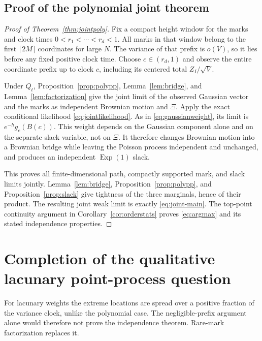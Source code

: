\documentclass[11pt,a4paper]{article}
\numberwithin{equation}{section}
\theoremstyle{definition}
\theoremstyle{remark}
\newcommand{\Exp}{\operatorname{Exp}}
\begin{document}
\subsection{Proof of the polynomial joint theorem}
\begin{proof}[Proof of Theorem~\ref{thm:jointpoly}]
Fix a compact height window for the marks and clock times
$0<r_1<\cdots<r_d<1$. All marks in that window belong to the first
$\lceil2M\rceil$ coordinates for large $N$. The variance of that
prefix is $o(V)$, so it lies before any fixed positive clock time.
Choose $c\in(r_d,1)$ and observe the entire coordinate prefix up to
clock $c$, including its centered total $Z_I/\sqrt V$.

Under $Q_t$, Proposition~\ref{prop:polypp}, Lemma~\ref{lem:bridge},
and Lemma~\ref{lem:factorization} give the joint limit of the observed
Gaussian vector and the marks as independent Brownian motion and
$\Xi$. Apply the exact conditional likelihood
\eqref{eq:jointlikelihood}. As in \eqref{eq:gaussianweight}, its
limit is $e^{-h}g_c(B(c))$. This weight depends on the Gaussian
component alone and on the separate slack variable, not on $\Xi$.
It therefore changes Brownian motion into a Brownian bridge while
leaving the Poisson process independent and unchanged, and produces
an independent $\Exp(1)$ slack.

This proves all finite-dimensional path, compactly supported mark,
and slack limits jointly. Lemma~\ref{lem:bridge},
Proposition~\ref{prop:polypp}, and Proposition~\ref{prop:slack}
give tightness of the three marginals, hence of their product.
The resulting joint weak limit is exactly \eqref{eq:joint-main}.
The top-point continuity argument in Corollary~\ref{cor:orderstats}
proves \eqref{eq:argmax} and its stated independence properties.
\end{proof}

\section{Completion of the qualitative lacunary point-process question}
\label{sec:lacunary}

For lacunary weights the extreme locations are spread over a positive
fraction of the variance clock, unlike the polynomial case. The
negligible-prefix argument alone would therefore not prove the
independence theorem. Rare-mark factorization replaces it.
\end{document}

